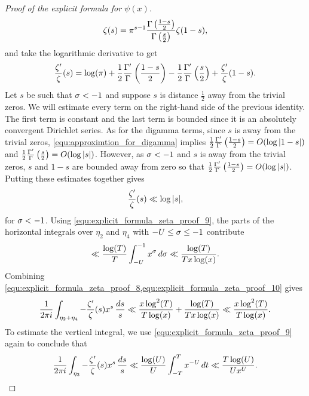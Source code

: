 \begin{proof}[Proof of the explicit formula for $\psi(x)$]
      \[
        \zeta(s) = \pi^{s-1}\frac{\Gamma\left(\frac{1-s}{2}\right)}{\Gamma\left(\frac{s}{2}\right)}\zeta(1-s),
      \]
      and take the logarithmic derivative to get
      \[
        \frac{\zeta'}{\zeta}(s) = \log(\pi)+\frac{1}{2}\frac{\Gamma'}{\Gamma}\left(\frac{1-s}{2}\right)-\frac{1}{2}\frac{\Gamma'}{\Gamma}\left(\frac{s}{2}\right)+\frac{\zeta'}{\zeta}(1-s).
      \]
      Let $s$ be such that $\sigma < -1$ and suppose $s$ is distance $\frac{1}{2}$ away from the trivial zeros. We will estimate every term on the right-hand side of the previous identity. The first term is constant and the last term is bounded since it is an absolutely convergent Dirichlet series. As for the digamma terms, since $s$ is away from the trivial zeros, \cref{equ:approximtion_for_digamma} implies $\frac{1}{2}\frac{\Gamma'}{\Gamma}\left(\frac{1-s}{2}\right) = O(\log{|1-s|})$ and $\frac{1}{2}\frac{\Gamma'}{\Gamma}\left(\frac{s}{2}\right) = O(\log{|s|})$. However, as $\sigma < -1$ and $s$ is away from the trivial zeros, $s$ and $1-s$ are bounded away from zero so that $\frac{1}{2}\frac{\Gamma'}{\Gamma}\left(\frac{1-s}{2}\right) = O(\log{|s|})$. Putting these estimates together gives
      \begin{equation}\label{equ:explicit_formula_zeta_proof_9}
        \frac{\zeta'}{\zeta}(s) \ll \log|s|,
      \end{equation}
      for $\sigma < -1$. Using \cref{equ:explicit_formula_zeta_proof_9}, the parts of the horizontal integrals over $\eta_{2}$ and $\eta_{4}$ with $-U \le \sigma \le -1$ contribute
      \begin{equation}\label{equ:explicit_formula_zeta_proof_10}
        \ll \frac{\log(T)}{T}\int_{-U}^{-1}x^{\sigma}\,d\sigma \ll \frac{\log(T)}{Tx\log(x)}.
      \end{equation}
      Combining \cref{equ:explicit_formula_zeta_proof_8,equ:explicit_formula_zeta_proof_10} gives
      \begin{equation}\label{equ:explicit_formula_zeta_proof_11}
        \frac{1}{2\pi i}\int_{\eta_{2}+\eta_{4}}-\frac{\zeta'}{\zeta}(s)x^{s}\,\frac{ds}{s} \ll \frac{x\log^{2}(T)}{T\log(x)}+\frac{\log(T)}{Tx\log(x)} \ll \frac{x\log^{2}(T)}{T\log(x)}.
      \end{equation}
      To estimate the vertical integral, we use \cref{equ:explicit_formula_zeta_proof_9} again to conclude that
      \begin{equation}\label{equ:explicit_formula_zeta_proof_12}
        \frac{1}{2\pi i}\int_{\eta_{3}}-\frac{\zeta'}{\zeta}(s)x^{s}\,\frac{ds}{s} \ll \frac{\log(U)}{U}\int_{-T}^{T}x^{-U}\,dt \ll \frac{T\log(U)}{Ux^{U}}.
      \end{equation}

\end{proof}
